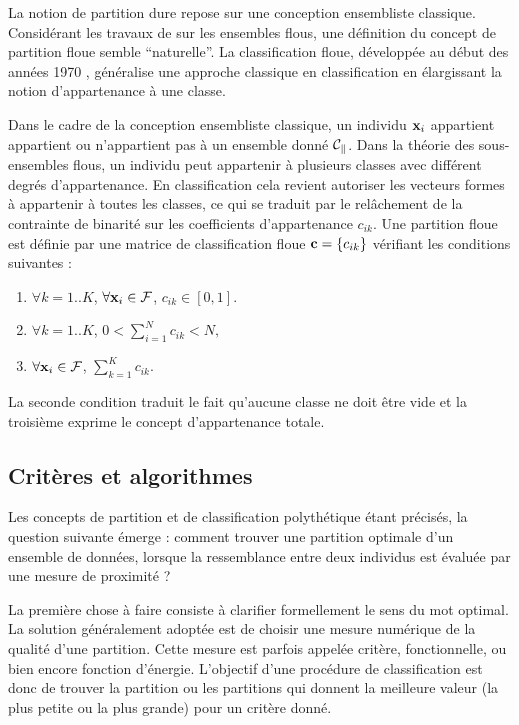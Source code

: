 La notion de partition dure repose sur une conception ensembliste
classique. Consid\'erant les travaux de  sur les ensembles
flous, une d\'efinition du concept de partition floue semble
``naturelle''. La classification floue, d\'evelopp\'ee au d\'ebut des
ann\'ees 1970 \cite{Ruspini1969}, g\'en\'eralise une approche
classique en classification en \'elargissant la notion
d'appartenance \`a une classe.

Dans le cadre de la conception ensembliste classique, un individu $\mbox{\bf x}_i$
appartient appartient ou n'appartient pas \`a un ensemble donn\'e ${\cal C_k}$.
Dans la th\'eorie des sous-ensembles flous, un individu peut
appartenir \`a plusieurs classes avec diff\'erent degr\'es d'appartenance.
En classification cela revient autoriser les vecteurs formes
\`a appartenir \`a toutes les classes, ce qui se traduit par le
rel\^achement de la contrainte de binarit\'e sur les coefficients 
d'appartenance $c_{ik}$. Une partition floue est d\'efinie par
une matrice de classification floue $\mbox{\bf c}=\{c_{ik}\}$ v\'erifiant les 
conditions suivantes :
\begin{enumerate}
\item $\forall k=1..K$, $\forall \mbox{\bf x}_i \in {\cal F}$, $c_{ik}\in [0,1]$.
\item $\forall k=1..K$, $0< \sum_{i=1}^N c_{ik} <N,$
\item $\forall \mbox{\bf x}_i \in {\cal F}$, $\sum_{k=1}^K c_{ik}.$ 
\end{enumerate}
La seconde condition traduit le fait qu'aucune classe
ne doit \^etre vide et la troisi\`eme exprime le 
concept d'appartenance totale.


\subsection{Crit\`eres et algorithmes}
Les concepts de partition et de classification polyth\'etique
\'etant pr\'ecis\'es, la question suivante \'emerge :
comment trouver une partition optimale d'un ensemble de donn\'ees,
lorsque la ressemblance entre deux individus est \'evalu\'ee par
une mesure de proximit\'e  ?

La premi\`ere chose \`a faire consiste \`a clarifier formellement
le sens du mot optimal. La solution g\'en\'eralement adopt\'ee est 
de choisir une mesure num\'erique de la qualit\'e d'une partition.
Cette mesure est parfois appel\'ee crit\`ere, fonctionnelle, ou
bien encore fonction d'\'energie. L'objectif d'une proc\'edure de classification
est donc de trouver la partition ou les partitions qui donnent la meilleure
 valeur (la plus petite ou la plus grande) pour un crit\`ere donn\'e.
 
